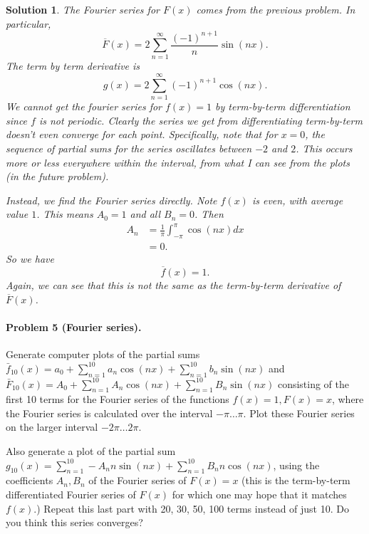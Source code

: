 \documentclass[leqno]{article}
\theoremstyle{nonumberplain}
\newtheorem{solution}{Solution}
\begin{document}
\begin{solution}
The Fourier series for $F(x)$ comes from the previous problem. In particular,
\[
\overline{F}(x)=2\sum_{n=1}^\infty \frac{(-1)^{n+1}}{n}\sin (nx).
\]
The term by term derivative is 
\[
g(x)=2\sum_{n=1}^\infty (-1)^{n+1}\cos(nx).
\]
We cannot get the fourier series for $f(x)=1$ by term-by-term differentiation since $f$ is not periodic. Clearly the series we get from differentiating term-by-term doesn't even converge for each point.  Specifically, note that for $x=0$, the sequence of partial sums for the series oscillates between $-2$ and $2$.  This occurs more or less everywhere within the interval, from what I can see from the plots (in the future problem).

Instead, we find the Fourier series directly.  Note $f(x)$ is even, with average value $1$.  This means $A_0=1$ and all $B_n=0$.  Then
\begin{align*}
A_n &= \frac{1}{\pi} \int_{-\pi}^\pi \cos(nx)dx\\
&=0.
\end{align*}
So we have
\[
\overline{f}(x)=1.
\]
Again, we can see that this is not the same as the term-by-term derivative of $\overline{F}(x)$.
\end{solution}
\pagebreak

\paragraph{Problem 5 (Fourier series).} Generate computer plots of the
partial sums $\bar f_{10}(x) = a_0 + \sum_{n=1}^{10} a_n \cos(nx) +
\sum_{n=1}^{10} b_n \sin(nx)$
and $\bar F_{10}(x) = A_0 + \sum_{n=1}^{10} A_n \cos(nx) + \sum_{n=1}^{10} B_n \sin(nx)$
consisting of the first 10 terms for the Fourier series of the functions
$f(x)=1, F(x)=x$, where the Fourier series is calculated over the interval
$-\pi\ldots\pi$. Plot these Fourier series on the larger interval $-2\pi\ldots
2\pi$. 

Also generate a plot of the partial sum $g_{10}(x)=\sum_{n=1}^{10} -A_n n
\sin(nx) + \sum_{n=1}^{10} B_n n \cos(nx)$, using the coefficients
$A_n,B_n$ of the Fourier series of $F(x)=x$ (this is the term-by-term
differentiated Fourier series of $F(x)$ for which one may hope that it
matches $f(x)$.) Repeat this last part with
20, 30, 50, 100 terms instead of just 10. Do you think this series converges?
\end{document}
